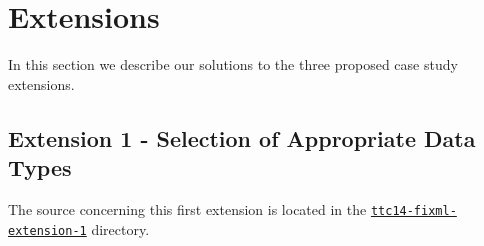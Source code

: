 
\section{Extensions}
\label{sec:Extensions}

In this section we describe our solutions to the three proposed case study extensions.

\subsection{Extension 1 - Selection of Appropriate Data Types}
\label{sec:Extension1}

The source concerning this first extension is located in the \href{https://github.com/fikovnik/ttc14-fixml-sigma/tree/master/ttc14-fixml-extension-1}{\texttt{ttc14-fixml-extension-1}} directory.

\bigskip

